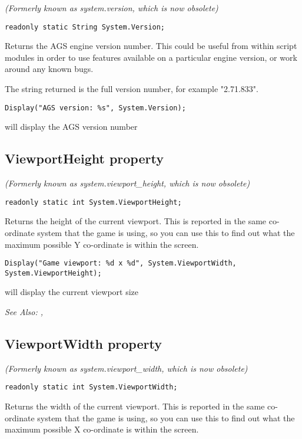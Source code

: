 \it{(Formerly known as system.version, which is now obsolete)}

\begin{verbatim}
readonly static String System.Version;
\end{verbatim}
Returns the AGS engine version number. This could be useful from within script modules
in order to use features available on a particular engine version, or work around
any known bugs.

The string returned is the full version number, for example "2.71.833".

\begin{verbatim}
Display("AGS version: %s", System.Version);
\end{verbatim}
will display the AGS version number


\subsection{ViewportHeight property}\label{System.ViewportHeight}%

\it{(Formerly known as system.viewport_height, which is now obsolete)}

\begin{verbatim}
readonly static int System.ViewportHeight;
\end{verbatim}
Returns the height of the current viewport. This is reported in the same co-ordinate system
that the game is using, so you can use this to find out what the maximum possible Y co-ordinate
is within the screen.

\begin{verbatim}
Display("Game viewport: %d x %d", System.ViewportWidth, System.ViewportHeight);
\end{verbatim}
will display the current viewport size

\it{See Also:} ,


\subsection{ViewportWidth property}\label{System.ViewportWidth}%

\it{(Formerly known as system.viewport_width, which is now obsolete)}

\begin{verbatim}
readonly static int System.ViewportWidth;
\end{verbatim}
Returns the width of the current viewport. This is reported in the same co-ordinate system
that the game is using, so you can use this to find out what the maximum possible X co-ordinate
is within the screen.

